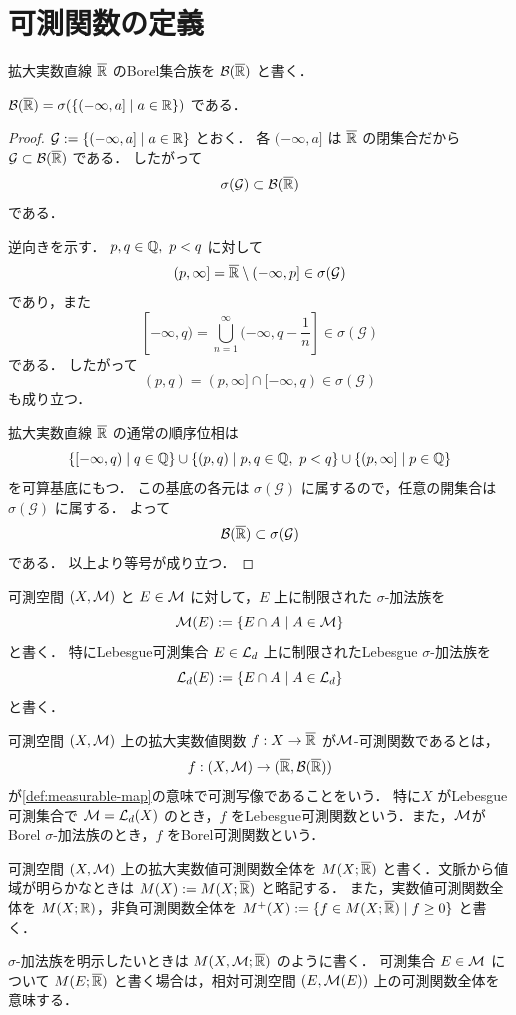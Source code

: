 \section{可測関数の定義}

拡大実数直線 $\overline{\mathbb R}$ のBorel集合族を
$\mathcal B(\overline{\mathbb R})$ と書く．
\begin{lemma}[拡大実数直線のBorel集合族] \label{lem:borel-eRR}
$\mathcal B(\overline{\mathbb R})=\sigma(\{(-\infty,a]\mid a\in\mathbb R\})$ である．
\end{lemma}
\begin{proof}
$\mathcal G:=\{(-\infty,a]\mid a\in\mathbb R\}$
とおく．
各 $(-\infty,a]$ は $\overline{\mathbb R}$ の閉集合だから
$\mathcal G\subset\mathcal B(\overline{\mathbb R})$ である．
したがって
\[\sigma(\mathcal G)\subset\mathcal B(\overline{\mathbb R})\]
である．

逆向きを示す．
$p,q\in\mathbb Q,\ p<q$ に対して
\[
(p,\infty]=\overline{\mathbb R}\setminus(-\infty,p]\in\sigma(\mathcal G)
\]
であり，また
\[
[-\infty,q)=\bigcup_{n=1}^{\infty}(-\infty,q-\frac1n]\in\sigma(\mathcal G)
\]
である．
したがって
\[
(p,q)=(p,\infty]\cap[-\infty,q)\in\sigma(\mathcal G)
\]
も成り立つ．

拡大実数直線 $\overline{\mathbb R}$ の通常の順序位相は
\[
\{[-\infty,q)\mid q\in\mathbb Q\}
\cup
\{(p,q)\mid p,q\in\mathbb Q,\ p<q\}
\cup
\{(p,\infty]\mid p\in\mathbb Q\}
\]
を可算基底にもつ．
この基底の各元は $\sigma(\mathcal G)$ に属するので，任意の開集合は
$\sigma(\mathcal G)$ に属する．
よって
\[
\mathcal B(\overline{\mathbb R})\subset\sigma(\mathcal G)
\]
である．
以上より等号が成り立つ．
\end{proof}

可測空間 $(X,\mathcal M)$ と $E\in\mathcal M$ に対して，$E$ 上に制限された
$\sigma$-加法族を
\[
\mathcal M(E):=\{E\cap A\mid A\in\mathcal M\}
\]
と書く．
特にLebesgue可測集合 $E \in \mathcal L_d$ 上に制限されたLebesgue $\sigma$-加法族を
\[
\mathcal L_d(E):=\{E\cap A \mid A\in \mathcal L_d\}
\]
と書く．

\begin{definition}[可測関数]\label{def:lebesgue-measurable-function}
可測空間 $(X,\mathcal M)$ 上の拡大実数値関数 $f:X \to \overline{\mathbb R}$
が$\mathcal M$-可測関数であるとは，
\[
f:(X,\mathcal M)\to (\overline{\mathbb R},\mathcal B(\overline{\mathbb R}))
\]
が\cref{def:measurable-map}の意味で可測写像であることをいう．
特に$X$ がLebesgue可測集合で $\mathcal M=\mathcal L_d(X)$ のとき，$f$ をLebesgue可測関数という．また，$\mathcal M$がBorel $\sigma$-加法族のとき，$f$ をBorel可測関数という．
\end{definition}

\begin{definition}[可測関数空間の記号]\label{def:measurable-function-space-notation}
可測空間 $(X,\mathcal M)$ 上の拡大実数値可測関数全体を
$M(X;\overline{\mathbb R})$ と書く．文脈から値域が明らかなときは $M(X):=M(X;\overline{\mathbb R})$ と略記する．
また，実数値可測関数全体を $M(X;\mathbb R)$，非負可測関数全体を
$M^+(X):=\{f\in M(X;\overline{\mathbb R})\mid f\ge 0\}$ と書く．

$\sigma$-加法族を明示したいときは $M(X,\mathcal M;\overline{\mathbb R})$ のように書く．
可測集合 $E\in\mathcal M$ について $M(E;\overline{\mathbb R})$ と書く場合は，相対可測空間 $(E,\mathcal M(E))$ 上の可測関数全体を意味する．
\end{definition}

